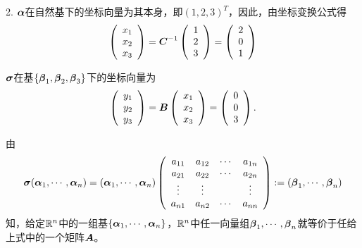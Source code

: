 \begin{frame}
  \begin{jie}
    2. $\boldsymbol{\alpha}$在自然基下的坐标向量为其本身，即$(1,2,3)^T$，因此，由坐标变换公式得
    $$
    \left(
      \begin{array}{c}
        x_1\\x_2\\x_3
      \end{array}
    \right)=\boldsymbol{C}^{-1}
    \left(
      \begin{array}{c}
        1\\2\\3
      \end{array}
    \right)=\left(
      \begin{array}{c}
        2\\0\\1
      \end{array}
    \right)
    $$ 

    $\boldsymbol{\sigma}$在基$\{\boldsymbol{\beta}_1,\boldsymbol{\beta}_2,\boldsymbol{\beta}_3\}$下的坐标向量为
    $$
    \left(
      \begin{array}{c}
        y_1\\y_2\\y_3
      \end{array}
    \right)=\boldsymbol{B}
    \left(
      \begin{array}{c}
        x_1\\x_2\\x_3
      \end{array}
    \right)=\left(
      \begin{array}{c}
        0\\0\\3
      \end{array}
    \right).
    $$
  \end{jie}
\end{frame}


\begin{frame}
  由
  $$
  \boldsymbol{\sigma}(\boldsymbol{\alpha}_1,\cdots,\boldsymbol{\alpha}_n)=(\boldsymbol{\alpha}_1,\cdots,\boldsymbol{\alpha}_n)\left(
    \begin{array}{cccc}
      a_{11}&a_{12}&\cdots&a_{1n}\\
      a_{21}&a_{22}&\cdots&a_{2n}\\
      \vdots&\vdots&&\vdots\\
      a_{n1}&a_{n2}&\cdots&a_{nn}
    \end{array}
  \right):=(\boldsymbol{\beta}_1,\cdots,\boldsymbol{\beta}_n)
  $$
  知，给定$\mathbb R^n$中的一组基$\{\boldsymbol{\alpha}_1,\cdots,\boldsymbol{\alpha}_n\}$，$\mathbb R^n$中任一向量组$\boldsymbol{\beta}_1,\cdots,\boldsymbol{\beta}_n$就等价于任给上式中的一个矩阵$\boldsymbol{A}$。\vspace{.1in} 

\end{frame}


